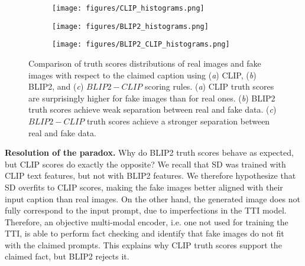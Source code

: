 \documentclass{article} \usepackage{iclr2024_conference,times}
\begin{document}
\begin{figure}
     \centering
     \begin{subfigure}[b]{0.325\textwidth}
         \centering
         \texttt{[image: figures/CLIP\_histograms.png]}
         \vspace{-1.5em}
         \caption{}
     \end{subfigure}
     \hfill
     \begin{subfigure}[b]{0.325\textwidth}
         \centering
         \texttt{[image: figures/BLIP2\_histograms.png]}
         \vspace{-1.5em}
         \caption{}
     \end{subfigure}
     \hfill
     \begin{subfigure}[b]{0.325\textwidth}
         \centering
         \texttt{[image: figures/BLIP2\_CLIP\_histograms.png]}
         \vspace{-1.5em}
         \caption{}
     \end{subfigure}
\caption{Comparison of truth scores distributions of real images and fake images with respect to the claimed caption using (\textit{a}) CLIP, (\textit{b}) BLIP2, and (\textit{c}) $BLIP2-CLIP$ scoring rules. (\textit{a}) CLIP truth scores are surprisingly higher for fake images than for real ones. (\textit{b}) BLIP2 truth scores achieve weak separation between real and fake data. (\textit{c}) $BLIP2-CLIP$ truth scores achieve a stronger separation between real and fake data.}
        \label{fig:Real_vs_Fakes_Histograms}
        \vspace{-0.5em}
\end{figure}


\textbf{Resolution of the paradox.} Why do BLIP2 truth scores behave as expected, but CLIP scores do exactly the opposite? We recall that SD was trained with CLIP text features, but not with BLIP2 features. We therefore hypothesize that SD overfits to CLIP scores, making the fake images better aligned with their input caption than real images. On the other hand, the generated image does not fully correspond to the input prompt, due to imperfections in the TTI model. Therefore, an objective multi-modal encoder, i.e. one not used for training the TTI, is able to perform fact checking and identify that fake images do not fit with the claimed prompts. This explains why CLIP truth scores support the claimed fact, but BLIP2 rejects it.
\end{document}
